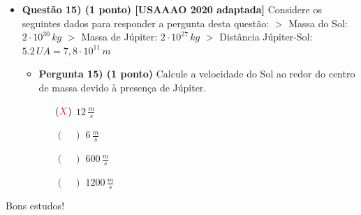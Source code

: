 \documentclass[a4paper, 12pt]{article}
\newcommand{\red}[1]{\textcolor{red}{#1}}
\begin{document}
\begin{flushleft}
\begin{itemize}
            \item \textbf{Questão 15) (1 ponto) [USAAAO 2020 adaptada]} Considere os seguintes dados para responder a pergunta desta questão: \linebreak\linebreak $>$ Massa do Sol: $2 \cdot 10^{30} \, kg$ \linebreak $>$ Massa de Júpiter: $2 \cdot 10^{27} \, kg$ \linebreak $>$ Distância Júpiter-Sol: $5.2 \, UA = 7,8 \cdot 10^{11} \, m$
                \begin{itemize}
                    \item \textbf{Pergunta 15) (1 ponto)} Calcule a velocidade do Sol ao redor do centro de massa devido à presença de Júpiter.
                        \begin{itemize}
                            \item[$(\red{X})$] $12 \, \frac{m}{s}$
                            \item[$(\quad)$] $6 \, \frac{m}{s}$
                            \item[$(\quad)$] $600 \, \frac{m}{s}$
                            \item[$(\quad)$] $1200 \, \frac{m}{s}$
                        \end{itemize}
                \end{itemize}
        \end{itemize} \end{flushleft}

    \begin{flushright}
		\begin{large}
			Bons estudos!
		\end{large}
	\end{flushright}
\end{document}
